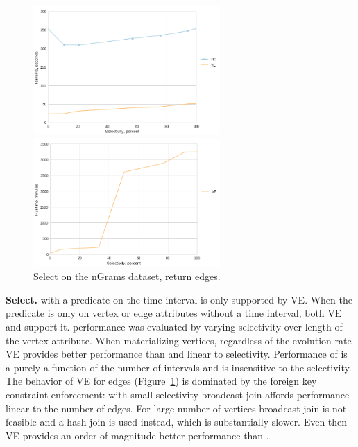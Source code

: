 \begin{figure}
\centering
\begin{minipage}{3.3in}
\centering
\includegraphics[width=2.8in]{figs/select_wikitalk_vertices_build12.png}
\caption{Select on the wikitalk dataset, return vertices.}
\label{fig:selectv}
\end{minipage}
\begin{minipage}{3.3in}
\centering
\includegraphics[width=2.8in]{figs/select_ngrams_edges_build12.png}
\caption{Select on the nGrams dataset, return edges.}
\label{fig:selecte}
\end{minipage}
\end{figure}

{\bf Select.}   with a predicate on the time interval is
only supported by VE.  When the predicate is only on vertex or edge
attributes without a time interval, both VE and \sg support it.
 performance was evaluated by varying selectivity over
length of the vertex attribute.  When materializing vertices,
regardless of the evolution rate VE provides better performance than
\sg and linear to selectivity.  Performance of \sg is a purely a
function of the number of intervals and is insensitive to the
selectivity.  The behavior of VE for edges (Figure~\ref{fig:selecte})
is dominated by the foreign key constraint enforcement: with small
selectivity broadcast join affords performance linear to the number of
edges.  For large number of vertices broadcast join is not feasible
and a hash-join is used instead, which is substantially slower.  Even
then VE provides an order of magnitude better performance than \sg.

